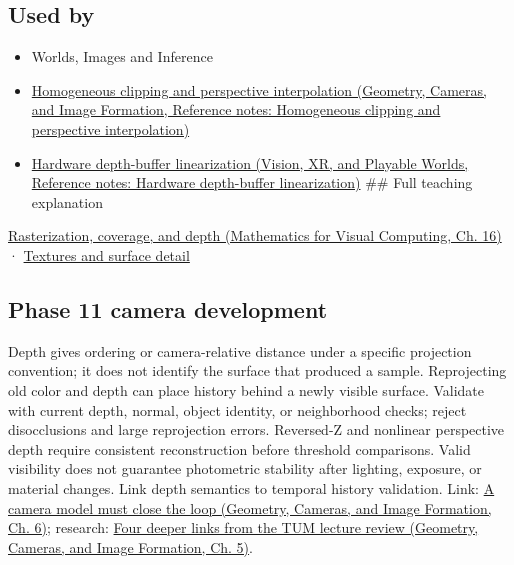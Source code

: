 \subsection{Used by}\label{appendix-97578ed97952-used-by}

\hypertarget{appendix-97578ed97952-used-by}{}

\begin{itemize}
\item
  {Worlds, Images and Inference}
\item
  \href{../03-Geometry-Cameras-and-Image-Formation/main.pdf\#nameddest=appendix-40426e4b2103}{Homogeneous clipping and perspective interpolation (Geometry, Cameras, and Image Formation, Reference notes: Homogeneous clipping and perspective interpolation)}
\item
  \href{../07-Vision-XR-and-Playable-Worlds/main.pdf\#nameddest=appendix-1bc40b08db4a}{Hardware depth-buffer linearization (Vision, XR, and Playable Worlds, Reference notes: Hardware depth-buffer linearization)} \#\# Full teaching explanation
\end{itemize}

\href{../02-Mathematics-for-Visual-Computing/main.pdf\#nameddest=03-visual-computing-i-ch012-rasterization-coverage-and-depth}{Rasterization, coverage, and depth (Mathematics for Visual Computing, Ch. 16)} · \hyperref[03-visual-computing-i-ch019-textures-and-surface-detail]{Textures and surface detail}

\subsection{Phase 11 camera development}\label{appendix-97578ed97952-phase-11-camera-development}

\hypertarget{appendix-97578ed97952-phase-11-camera-development}{}

Depth gives ordering or camera-relative distance under a specific projection convention; it does not identify the surface that produced a sample. Reprojecting old color and depth can place history behind a newly visible surface. Validate with current depth, normal, object identity, or neighborhood checks; reject disocclusions and large reprojection errors. Reversed-Z and nonlinear perspective depth require consistent reconstruction before threshold comparisons. Valid visibility does not guarantee photometric stability after lighting, exposure, or material changes. Link depth semantics to temporal history validation. Link: \href{../03-Geometry-Cameras-and-Image-Formation/main.pdf\#nameddest=02-foundations-ii-ch037-a-camera-model-must-close-the-loop}{A camera model must close the loop (Geometry, Cameras, and Image Formation, Ch. 6)}; research: \href{../03-Geometry-Cameras-and-Image-Formation/main.pdf\#nameddest=02-foundations-ii-ch036-four-deeper-links-from-the-tum-lecture-review}{Four deeper links from the TUM lecture review (Geometry, Cameras, and Image Formation, Ch. 5)}.
